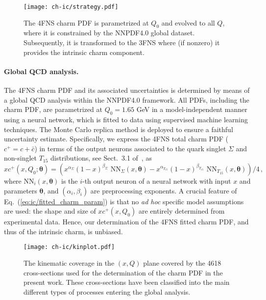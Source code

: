 \begin{figure}[h]
\begin{center}
  \texttt{[image: ch-ic/strategy.pdf]}
 \end{center}
\vspace{-0.2cm}
\caption{The 4FNS charm PDF is parametrized  at $Q_0$
  and evolved to all  $Q$, where it is  constrained by the NNPDF4.0
  global dataset. 
 Subsequently, it is transformed to the 3FNS where (if nonzero) it
 provides the intrinsic charm component.
  \label{fig:ic/strategy}
}
\end{figure}

\paragraph{Global QCD analysis.}
%
The 4FNS charm PDF and its associated
uncertainties is determined by means of a global QCD analysis
within the NNPDF4.0 framework.
%
All PDFs, including the charm PDF, are  parametrized at $Q_0=1.65$ GeV in 
a model-independent manner using a neural network, which is fitted to data using 
supervised machine learning techniques.
The Monte Carlo replica method
is deployed to ensure a faithful uncertainty estimate.
%
Specifically, we express the 4FNS total charm PDF ($c^+=c+\bar{c}$)  in terms of the output neurons associated to the quark singlet $\Sigma$ and non-singlet $T_{15}$
distributions, see Sect.~3.1 of~\cite{Ball:2021leu}, as
\begin{equation}
\label{eq:ic/fitted_charm_param}
xc^+(x,Q_0;{\boldsymbol \theta}) =
\left( x^{\alpha_{\Sigma}}(1-x)^{\beta_{\Sigma}} \textrm{ NN}_{\Sigma}(x,{\boldsymbol \theta})-
x^{\alpha_{T_{15}}}(1-x)^{\beta_{T_{15}}} \textrm{ NN}_{T_{15}}(x,{\boldsymbol \theta})
\right)/4 \, ,
\end{equation}
where $\textrm{NN}_{i}(x,{\boldsymbol \theta})$ is the $i$-th output neuron of
a neural network with input $x$ and  parameters ${\boldsymbol \theta}$, and 
$\left(\alpha_i,\beta_i\right)$ are preprocessing exponents.
%
A crucial feature of Eq.~(\ref{eq:ic/fitted_charm_param}) is that no \textit{
ad hoc} specific model assumptions are used: the shape and size of
$xc^+(x,Q_0)$ are entirely determined from experimental data.
%
Hence, our determination of the 4FNS fitted charm PDF, and thus of the intrinsic charm, is unbiased.
%

\begin{figure}[t]
\begin{center}
  \texttt{[image: ch-ic/kinplot.pdf]}
 \end{center}
\vspace{-0.8cm}
\caption{The kinematic coverage in the $(x,Q)$ plane
  covered by the 4618 cross-sections used for the
  determination of the charm PDF in the present work.
  These cross-sections have been classified into the main different
  types of processes entering the global analysis.
  \label{fig:ic/kinplot}
}
\end{figure}

